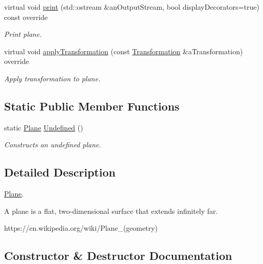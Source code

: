 \begin{DoxyCompactItemize}
virtual void \hyperlink{classlibrary_1_1math_1_1geom_1_1d3_1_1objects_1_1_plane_a2e43e82344b57898606f5c13ffc9dcc9}{print} (std\+::ostream \&an\+Output\+Stream, bool display\+Decorators=true) const override
\begin{DoxyCompactList}\small\item\em Print plane. \end{DoxyCompactList}\item 
virtual void \hyperlink{classlibrary_1_1math_1_1geom_1_1d3_1_1objects_1_1_plane_ab3474aef2e9f8dd4f9e86da017522487}{apply\+Transformation} (const \hyperlink{classlibrary_1_1math_1_1geom_1_1d3_1_1_transformation}{Transformation} \&a\+Transformation) override
\begin{DoxyCompactList}\small\item\em Apply transformation to plane. \end{DoxyCompactList}\end{DoxyCompactItemize}
\subsection*{Static Public Member Functions}
\begin{DoxyCompactItemize}
\item 
static \hyperlink{classlibrary_1_1math_1_1geom_1_1d3_1_1objects_1_1_plane}{Plane} \hyperlink{classlibrary_1_1math_1_1geom_1_1d3_1_1objects_1_1_plane_a582c0e5930dd4a458c557c866b0dae17}{Undefined} ()
\begin{DoxyCompactList}\small\item\em Constructs an undefined plane. \end{DoxyCompactList}\end{DoxyCompactItemize}


\subsection{Detailed Description}
\hyperlink{classlibrary_1_1math_1_1geom_1_1d3_1_1objects_1_1_plane}{Plane}. 

A plane is a flat, two-\/dimensional surface that extends infinitely far.

https\+://en.wikipedia.\+org/wiki/\+Plane\+\_\+(geometry) 

\subsection{Constructor \& Destructor Documentation}
\mbox{\label{classlibrary_1_1math_1_1geom_1_1d3_1_1objects_1_1_plane_a81fe78a983e2cb6ee6ad9bfabd22c3a4}} 
